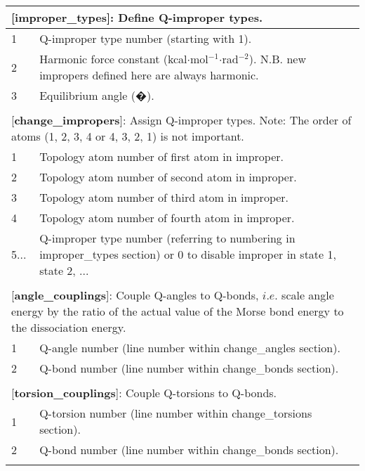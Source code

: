 \documentclass[a4paper,10pt]{article}
\begin{document}
\begin{longtable}{|p{53pt}|p{181pt}|p{160pt}|}
\multicolumn{3}{p{394pt}}{[\textbf{improper\_types}]: Define Q-improper types.}\\
\hline 1 & \multicolumn{2}{p{341pt}|}{Q-improper type number (starting with 1).}\\
\hline 2 & \multicolumn{2}{p{341pt}|}{Harmonic force constant (kcal$\cdot$mol$^{-1}$$\cdot$rad$^{-2}$). N.B. new impropers defined here are always harmonic.}\\
\hline 3 & \multicolumn{2}{p{341pt}|}{Equilibrium angle (�).}\\
\hline
\multicolumn{3}{p{394pt}}{}\\

\multicolumn{3}{p{394pt}}{[\textbf{change\_impropers}]: Assign Q-improper types. Note: The order of atoms (1, 2, 3, 4 or 4, 3, 2, 1) is not important.}\\
\hline 1 & \multicolumn{2}{p{341pt}|}{Topology atom number of first atom in improper.}\\
\hline 2 & \multicolumn{2}{p{341pt}|}{Topology atom number of second atom in improper.}\\
\hline 3 & \multicolumn{2}{p{341pt}|}{Topology atom number of third atom in improper.}\\
\hline 4 & \multicolumn{2}{p{341pt}|}{Topology atom number of fourth atom in improper.}\\
\hline 5... & \multicolumn{2}{p{341pt}|}{Q-improper type number (referring to numbering in improper\_types section) or 0 to disable improper in state 1, state 2, ...}\\
\hline
\multicolumn{3}{p{394pt}}{}\\

\multicolumn{3}{p{394pt}}{[\textbf{angle\_couplings}]: Couple Q-angles to Q-bonds, $i.e.$ scale angle energy by the ratio of the actual value of the Morse bond energy to the dissociation energy.}\\
\hline 1 & \multicolumn{2}{p{341pt}|}{Q-angle number (line number within change\_angles section).}\\
\hline 2 & \multicolumn{2}{p{341pt}|}{Q-bond number (line number within change\_bonds section).}\\
\hline
\multicolumn{3}{p{394pt}}{}\\

\multicolumn{3}{p{394pt}}{[\textbf{torsion\_couplings}]: Couple Q-torsions to Q-bonds.}\\
\hline 1 & \multicolumn{2}{p{341pt}|}{Q-torsion number (line number within change\_torsions section).}\\
\hline 2 & \multicolumn{2}{p{341pt}|}{Q-bond number (line number within change\_bonds section).}\\
\hline
\multicolumn{3}{p{394pt}}{}\\


\end{longtable}
\end{document}
